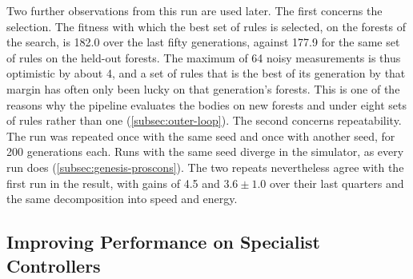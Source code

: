 Two further observations from this run are used later. The first concerns the selection. The fitness with which the best set of rules is selected, on the forests of the search, is 182.0 over the last fifty generations, against 177.9 for the same set of rules on the held-out forests. The maximum of 64 noisy measurements is thus optimistic by about 4, and a set of rules that is the best of its generation by that margin has often only been lucky on that generation's forests. This is one of the reasons why the pipeline evaluates the bodies on new forests and under eight sets of rules rather than one (\autoref{subsec:outer-loop}). The second concerns repeatability. The run was repeated once with the same seed and once with another seed, for 200 generations each. Runs with the same seed diverge in the simulator, as every run does (\autoref{subsec:genesis-proscons}). The two repeats nevertheless agree with the first run in the result, with gains of 4.5 and $3.6 \pm 1.0$ over their last quarters and the same decomposition into speed and energy.

\subsection{Improving Performance on Specialist Controllers}
\label{subsec:results-specialist}

